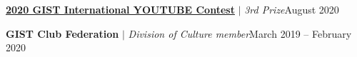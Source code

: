     \resumeProjectHeading
          {\textbf{\hyperlink{https://www.youtube.com/watch?v=zaSJ0eBUpOQ}{2020 GIST International YOUTUBE Contest}} $|$ \emph{3rd Prize}}{August 2020}
          \resumeItemListStart
            \resumeItemListEnd
            
        \resumeProjectHeading
          {\textbf{GIST Club Federation} $|$ \emph{Division of Culture member}}{March 2019 -- February 2020}
          \resumeItemListStart
            
    \resumeItemListEnd

\resumeSubHeadingListEnd